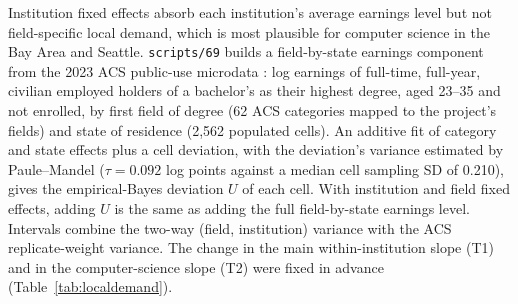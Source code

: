 \documentclass[11pt]{article}
\newcommand{\scr}[1]{\texttt{scripts/#1}}
\begin{document}
Institution fixed effects absorb each institution's average earnings level but not field-specific local demand,
which is most plausible for computer science in the Bay Area and Seattle. \scr{69} builds a field-by-state earnings
component from the 2023 ACS public-use microdata \citep{census_acs2023_pums}: log earnings of full-time, full-year,
civilian employed holders of a bachelor's as their highest degree, aged 23--35 and not enrolled, by first field of degree (62 ACS categories
mapped to the project's fields) and state of residence (2,562 populated cells). An additive fit of category and
state effects plus a cell deviation, with the deviation's variance estimated by Paule--Mandel \citep{paule1982consensus} ($\tau=0.092$ log
points against a median cell sampling SD of 0.210), gives the empirical-Bayes deviation $U$ of each cell. With
institution and field fixed effects, adding $U$ is the same as adding the full field-by-state earnings level.
Intervals combine the two-way (field, institution) variance with the ACS replicate-weight variance. The change in
the main within-institution slope (T1) and in the computer-science slope (T2) were fixed in advance
(Table~\ref{tab:localdemand}).
\end{document}
